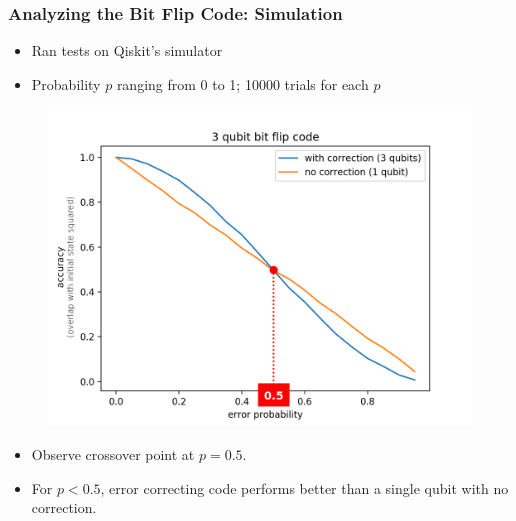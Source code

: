 \documentclass{beamer}
\begin{document}
\begin{frame}
    \frametitle{Analyzing the Bit Flip Code: Simulation}
    \begin{itemize}
        \item Ran tests on Qiskit's simulator
        \item Probability $p$ ranging from 0 to 1; 10000 trials for each $p$
    \end{itemize}
    \begin{minipage}{0.45\textwidth}
        \begin{figure}[H]
        \includegraphics[scale=0.16]{3qb-bf-overlay copy.png}
        \end{figure}
        \end{minipage} \hfill
        \begin{minipage}{0.45\textwidth}
        \begin{itemize}
        \item Observe crossover point at $p=0.5$.
        \item For $p<0.5$, error correcting code performs better than a single qubit with no correction.
        \end{itemize}
    \end{minipage}
\end{frame}

    
\end{document}
